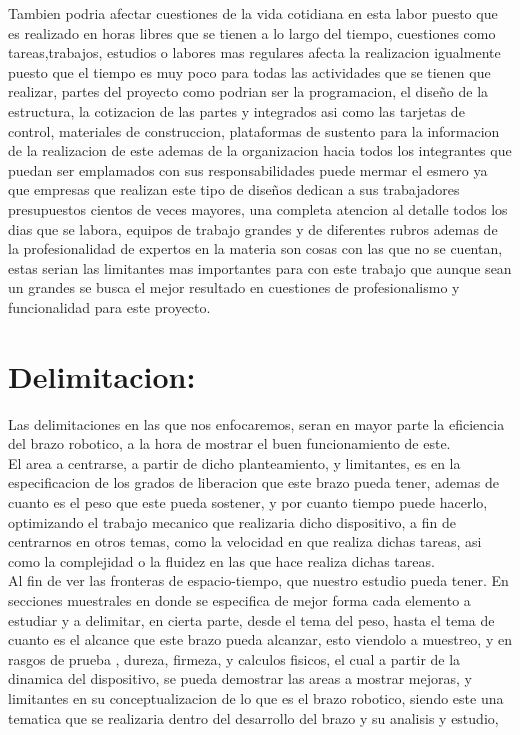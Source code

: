 \documentclass[14pt,a4paper]{article}
\begin{document}
Tambien podria afectar cuestiones de la vida cotidiana en esta labor puesto que es realizado en horas libres que se tienen a lo largo del tiempo, cuestiones como tareas,trabajos, estudios o labores mas regulares afecta la realizacion igualmente puesto que el tiempo es muy poco para todas las actividades que se tienen que realizar, partes del proyecto como podrian ser la programacion, el diseño de la estructura, la cotizacion de las partes y integrados asi como las tarjetas de control, materiales de construccion, plataformas de sustento para la informacion de la realizacion de este ademas de la organizacion hacia todos los integrantes que puedan ser emplamados con sus responsabilidades puede mermar el esmero ya que empresas que realizan este tipo de diseños dedican a sus trabajadores presupuestos cientos de veces mayores, una completa atencion al detalle todos los dias que se labora, equipos de trabajo grandes y de diferentes rubros ademas de la profesionalidad de expertos en la materia son cosas con las que no se cuentan, estas serian las limitantes mas importantes para con este trabajo que aunque sean un grandes se busca el mejor resultado en cuestiones de profesionalismo y funcionalidad para este proyecto. 

\section{Delimitacion:}

Las delimitaciones en las que nos enfocaremos, seran en mayor parte la eficiencia del brazo robotico, a la hora de mostrar el buen funcionamiento de este.\\
El area a centrarse, a partir de dicho planteamiento, y limitantes, es en la especificacion de los grados de liberacion que este brazo pueda tener, ademas de cuanto es el peso que este pueda sostener, y por cuanto tiempo puede hacerlo, optimizando el trabajo mecanico que realizaria dicho dispositivo, a fin de centrarnos en otros temas, como la velocidad en que realiza dichas tareas, asi como la complejidad o la fluidez en las que hace realiza dichas tareas.\\
Al fin de ver las fronteras de espacio-tiempo, que nuestro estudio pueda tener. En secciones muestrales en donde se especifica de mejor forma cada elemento a estudiar y a delimitar, en cierta parte, desde el tema del peso, hasta el tema de cuanto es el alcance que este brazo pueda alcanzar, esto viendolo a muestreo, y en rasgos de prueba , dureza, firmeza, y calculos fisicos, el cual a partir de la dinamica del dispositivo, se pueda demostrar las areas a mostrar mejoras, y limitantes en su conceptualizacion de lo que es el brazo robotico, siendo este una tematica que se realizaria dentro del desarrollo del brazo y su analisis y estudio,
\end{document}
